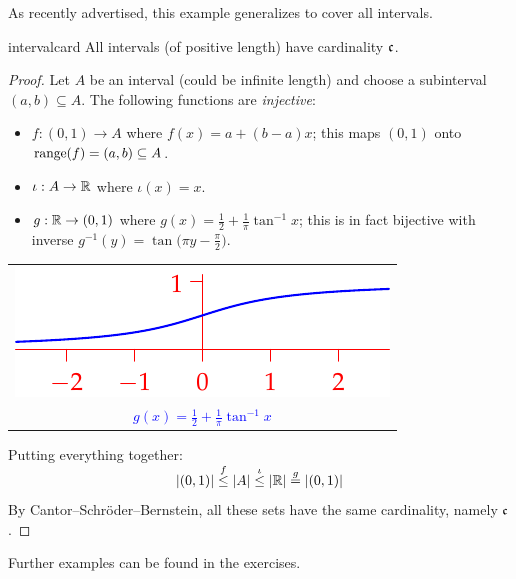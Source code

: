 As recently advertised, this example generalizes to cover all intervals.

\begin{cor}{}{intervalcard}
	All intervals (of positive length) have cardinality $\mathfrak{c}$.
\end{cor}

\begin{proof}
	Let $A$ be an interval (could be infinite length) and choose a subinterval $(a,b)\subseteq A$. The following functions are \emph{injective}:\par
	\begin{minipage}[t]{0.6\linewidth}\vspace{0pt}
		\begin{itemize}
	  	\item $f:(0,1)\to A$ where $f(x)=a+(b-a)x$; this maps $(0,1)$ onto $\operatorname{range}(f)=(a,b)\subseteq A$.
	  	\item $\iota:A\to\mathbb{R}$ where $\iota(x)=x$.
	  	\item $g:\mathbb{R}\to(0,1)$ where $g(x)= \frac 12+\frac 1\pi\tan^{-1}x$; this is in fact bijective with inverse $g^{-1}(y)=\tan\bigl(\pi y-\frac\pi 2\bigr)$.
		\end{itemize}
	\end{minipage}
	\hfill
	\begin{minipage}[t]{0.39\linewidth}\vspace{0pt}
		\hfill
		\begin{tabular}{@{}c@{}}
			\includegraphics{cardinality-03-tan}
			\\
			\textcolor{blue}{$g(x)=\frac 12+\frac 1\pi\tan^{-1}x$}
		\end{tabular}
	\end{minipage}
	\bigbreak
	Putting everything together:
	\[
		\smash[t]{\left| (0,1)\right|\overset{f}{\le}
		\left| A\right|\overset{\iota}{\le}
		\left| \mathbb{R}\right| \overset{g}{=}\left| (0,1)\right|}
	\]
	By Cantor--Schröder--Bernstein, all these sets have the same cardinality, namely $\mathfrak{c}$.
\end{proof}

Further examples can be found in the exercises.

\vfil\goodbreak


